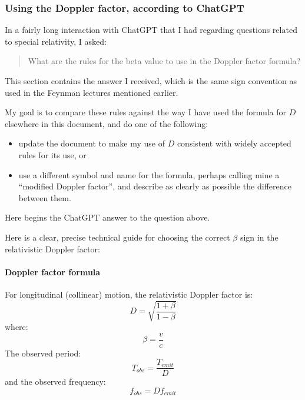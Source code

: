 \documentclass[a4paper]{article}
\theoremstyle{plain}
\theoremstyle{definition}
\begin{document}
\subsubsection{Using the Doppler factor, according to ChatGPT}
\label{sec:DopplerFactorSignRulesChatGPT}

In a fairly long interaction with ChatGPT that I had regarding
questions related to special relativity, I asked:
\begin{quote}
What are the rules for the beta value to use in the Doppler factor
formula?
\end{quote}
This section contains the answer I received, which is the same sign
convention as used in the Feynman lectures mentioned earlier.

My goal is to compare these rules against the way I have used the
formula for $D$ elsewhere in this document, and do one of the following:
\begin{itemize}
\item update the document to make my use of $D$ consistent with widely
  accepted rules for its use, or
\item use a different symbol and name for the formula, perhaps calling
  mine a ``modified Doppler factor'', and describe as clearly as
  possible the difference between them.
\end{itemize}

Here begins the ChatGPT answer to the question above.

Here is a clear, precise technical guide for choosing the correct
$\beta$ sign in the relativistic Doppler factor:

\paragraph{Doppler factor formula}

For longitudinal (collinear) motion, the relativistic Doppler factor is:
\begin{equation}
D = \sqrt{ \frac{1+\beta}{1-\beta} }
\end{equation}
where:
\begin{equation}
\beta = \frac{v}{c}
\end{equation}
The observed period:
\begin{equation}
T_{obs} = \frac{T_{emit}}{D}
\end{equation}
and the observed frequency:
\begin{equation}
f_{obs} = D f_{emit}
\end{equation}
\end{document}

